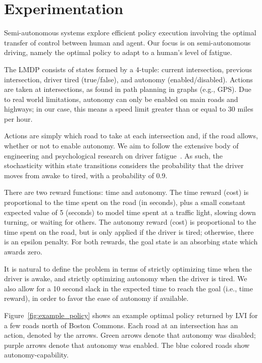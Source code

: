 \section{Experimentation}
\label{sec:experimentation}

Semi-autonomous systems explore efficient policy execution involving the optimal transfer of control between human and agent. Our focus is on semi-autonomous driving, namely the optimal policy to adapt to a human's level of fatigue.

The LMDP consists of states formed by a 4-tuple: current intersection, previous intersection, driver tired (true/false), and autonomy (enabled/disabled). Actions are taken at intersections, as found in path planning in graphs (e.g., GPS). Due to real world limitations, autonomy can only be enabled on main roads and highways; in our case, this means a speed limit greater than or equal to 30 miles per hour.


Actions are simply which road to take at each intersection and, if the road allows, whether or not to enable autonomy. We aim to follow the extensive body of engineering and psychological research on driver fatigue~\cite{Ji04-RealTimeMonitoringDriverFatigue}. As such, the stochasticity within state transitions considers the probability that the driver moves from awake to tired, with a probability of 0.9.

There are two reward functions: time and autonomy. The time reward (cost) is proportional to the time spent on the road (in seconds), plus a small constant expected value of 5 (seconds) to model time spent at a traffic light, slowing down turning, or waiting for others. The autonomy reward (cost) is proportional to the time spent on the road, but is only applied if the driver is tired; otherwise, there is an epsilon penalty. For both rewards, the goal state is an absorbing state which awards zero.

It is natural to define the problem in terms of strictly optimizing time when the driver is awake, and strictly optimizing autonomy when the driver is tired. We also allow for a 10 second slack in the expected time to reach the goal (i.e., time reward), in order to favor the ease of autonomy if available.

Figure~\ref{fig:example_policy} shows an example optimal policy returned by LVI for a few roads north of Boston Commons. Each road at an intersection has an action, denoted by the arrows. Green arrows denote that autonomy was disabled; purple arrows denote that autonomy was enabled. The blue colored roads show autonomy-capability. %

